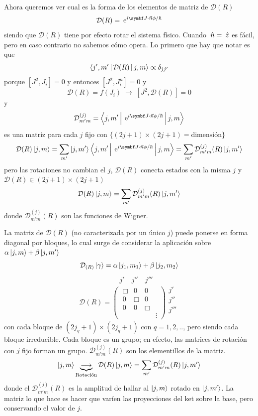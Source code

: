 \documentclass[10pt,oneside]{CBFT_book}
\begin{document}
Ahora queremos ver cual es la forma de los elementos de matriz de $\mathcal{D}(R)$
\[
	\mathcal{D}(R) = \euler^{i \vb{J}\cdot\vec{n}\phi/\hbar}
\]
siendo que $\mathcal{D}(R)$ tiene por efecto rotar el sistema físico.
Cuando $\:\hat{n} = \:\hat{z} $ es fácil, pero en caso contrario no sabemos cómo opera.
Lo primero que hay que notar es que 
\[
	\Braket{j',m'|\mathcal{D}(R)|j,m}  \propto \delta_{jj'}
\]
porque $[J^2,J_i]=0$ y entonces $[J^2,J_i^n]=0$ y 
\[
	\mathcal{D}(R) = f(J_i) \; \longrightarrow \; [ J^2, \mathcal{D}(R) ] = 0
\]
y 
\[
	\mathcal{D}^{(j)}_{m' m} =  \Braket{j,m'|\euler^{i \vb{J}\cdot\vec{n}\phi/\hbar}|j,m} 
\]
es una matriz para cada $j$ fijo con $\{ (2j+1)\times(2j+1)=\text{dimensión}\}$
\[
	\mathcal{D}(R)\Ket{j,m} = \sum_{m'} \ket{j,m'}\Braket{j,m'|\euler^{i \vb{J}\cdot\vec{n}\phi/\hbar}|j,m} 
	= \sum_{m'} \mathcal{D}^{(j)}_{m' m}(R) \Ket{j,m'} 
\]
pero las rotaciones no cambian el $j$, $\mathcal{D}(R)$ conecta estados con la misma $j$ y $\mathcal{D}(R) 
\in (2j+1)\times(2j+1)$ 
\[
	\mathcal{D}(R)\Ket{j,m} = \sum_{m'} \mathcal{D}^{(j)}_{m' m}(R) \Ket{j,m'} 
\]
donde $\mathcal{D}^{(j)}_{m' m}(R)$ son las funciones de Wigner.

La matriz de $\mathcal{D}(R)$ (no caracterizada por un único $j$) puede ponerse en forma diagonal por bloques,
lo cual surge de considerar la aplicación sobre $ \alpha \Ket{j,m} + \beta \Ket{j,m'} $
\[
	\mathcal{D}_{(R)}\Ket{\gamma} = \alpha \Ket{j_1,m_1} + \beta \Ket{j_2,m_2}
\]
\[
\begin{matrix} \qquad j' \quad j'' \quad j''' \end{matrix}
\]
\[
	\mathcal{D}(R) = \begin{pmatrix}
	\; \Box & 0 & 0 & \\
	\; 0 & \Box & 0 & \\
	\; 0 & 0 & \Box & \\
	\; & & & \vdots
	\end{pmatrix} \begin{matrix} j' \\ j'' \\ j'''\\ \\ \end{matrix}
\]
con cada bloque de $(2j_q+1)\times(2j_q+1)$ con $q=1,2,..$, pero siendo cada bloque irreducible. 
Cada bloque es un grupo; en efecto, las matrices de rotación con $j$ fijo forman un grupo. 
$\mathcal{D}_{m'm}^{(j)}(R)$ son los elementillos de la matriz.
\[
	\Ket{j,m} \underbrace{\longrightarrow}_{\text{Rotación}} \mathcal{D}(R)\Ket{j,m} =
	 \sum_{m'} \mathcal{D}^{(j)}_{m' m}(R) \Ket{j,m'} 
\]
donde el $\mathcal{D}^{(j)}_{m' m}(R)$ es la amplitud de hallar al $\Ket{j,m}$ rotado en $\Ket{j,m'}$.
La matriz lo que hace es hacer que varíen las proyecciones del ket sobre la base, pero conservando
el valor de $j$.
\end{document}
